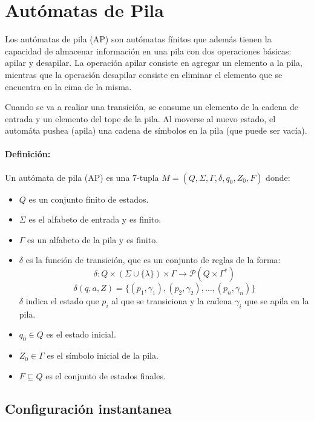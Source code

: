 \section{Autómatas de Pila}
\label{sec:automatas-pila}

Los autómatas de pila (AP) son autómatas fínitos que además tienen la capacidad de almacenar información en una pila con dos operaciones básicas: apilar y desapilar. La operación apilar consiste en agregar un elemento a la pila, mientras que la operación desapilar consiste en eliminar el elemento que se encuentra en la cima de la misma.

Cuando se va a realiar una transición, se consume un elemento de la cadena de entrada y un elemento del tope de la pila. Al moverse al  nuevo estado, el automáta pushea (apila) una cadena de símbolos en la pila (que puede ser vacía).

\paragraph{Definición:} Un autómata de pila (AP) es una 7-tupla $M = (Q, \Sigma, \Gamma, \delta, q_0, Z_0, F)$ donde:

\begin{itemize}
  \item $Q$ es un conjunto finito de estados.
  \item $\Sigma$ es el alfabeto de entrada y es finito.
  \item $\Gamma$ es un alfabeto de la pila y es finito.
  \item $\delta$ es la función de transición, que es un conjunto de reglas de la forma:
        \[ \delta: Q \times (\Sigma\cup\{\lambda\}) \times \Gamma \rightarrow \mathcal{P}(Q\times\Gamma^*) \]
        \[ \delta(q, a, Z) = \{ (p_1, \gamma_1), (p_2, \gamma_2), \ldots, (p_n, \gamma_n) \} \]
        \(\delta\) indica el estado que \(p_i\) al que se transiciona y la cadena \(\gamma_i\) que se apila en la pila.
  \item $q_0 \in Q$ es el estado inicial.
  \item $Z_0 \in \Gamma$ es el símbolo inicial de la pila.
  \item $F\subseteq Q$ es el conjunto de estados finales.
\end{itemize}

\subsection{Configuración instantanea}
\label{subsec:configuracion-instantanea}

